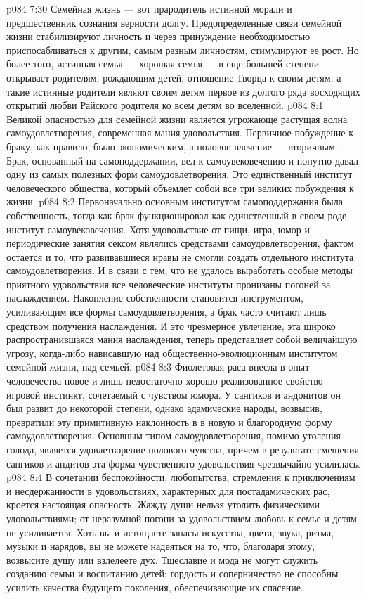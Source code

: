 \vs p084 7:30 Семейная жизнь --- вот прародитель истинной морали и предшественник сознания верности долгу. Предопределенные связи семейной жизни стабилизируют личность и через принуждение необходимостью приспосабливаться к другим, самым разным личностям, стимулируют ее рост. Но более того, истинная семья --- хорошая семья --- в еще большей степени открывает родителям, рождающим детей, отношение Творца к своим детям, а такие истинные родители являют своим детям первое из долгого ряда восходящих открытий любви Райского родителя ко всем детям во вселенной.
\vs p084 8:1 Великой опасностью для семейной жизни является угрожающе растущая волна самоудовлетворения, современная мания удовольствия. Первичное побуждение к браку, как правило, было экономическим, а половое влечение --- вторичным. Брак, основанный на самоподдержании, вел к самоувековечению и попутно давал одну из самых полезных форм самоудовлетворения. Это единственный институт человеческого общества, который объемлет собой все три великих побуждения к жизни.
\vs p084 8:2 Первоначально основным институтом самоподдержания была собственность, тогда как брак функционировал как единственный в своем роде институт самоувековечения. Хотя удовольствие от пищи, игра, юмор и периодические занятия сексом являлись средствами самоудовлетворения, фактом остается и то, что развивавшиеся нравы не смогли создать отдельного института самоудовлетворения. И в связи с тем, что не удалось выработать особые методы приятного удовольствия все человеческие институты пронизаны погоней за наслаждением. Накопление собственности становится инструментом, усиливающим все формы самоудовлетворения, а брак часто считают лишь средством получения наслаждения. И это чрезмерное увлечение, эта широко распространившаяся мания наслаждения, теперь представляет собой величайшую угрозу, когда\hyp{}либо нависавшую над общественно\hyp{}эволюционным институтом семейной жизни, над семьей.
\vs p084 8:3 Фиолетовая раса внесла в опыт человечества новое и лишь недостаточно хорошо реализованное свойство --- игровой инстинкт, сочетаемый с чувством юмора. У сангиков и андонитов он был развит до некоторой степени, однако адамические народы, возвысив, превратили эту примитивную наклонность в  в новую и благородную форму самоудовлетворения. Основным типом самоудовлетворения, помимо утоления голода, является удовлетворение полового чувства, причем в результате смешения сангиков и андитов эта форма чувственного удовольствия чрезвычайно усилилась.
\vs p084 8:4 В сочетании беспокойности, любопытства, стремления к приключениям и несдержанности в удовольствиях, характерных для постадамических рас, кроется настоящая опасность. Жажду души нельзя утолить физическими удовольствиями; от неразумной погони за удовольствием любовь к семье и детям не усиливается. Хоть вы и истощаете запасы искусства, цвета, звука, ритма, музыки и нарядов, вы не можете надеяться на то, что, благодаря этому, возвысите душу или взлелеете дух. Тщеславие и мода не могут служить созданию семьи и воспитанию детей; гордость и соперничество не способны усилить качества будущего поколения, обеспечивающие их спасение.
